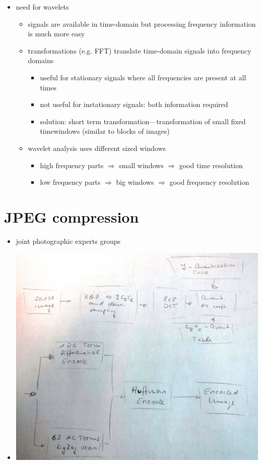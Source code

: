 \documentclass[a4paper,10pt]{scrreprt}
\begin{document}
\begin{itemize}
\begin{itemize}
 \end{itemize}
 \item need for wavelets
 \begin{itemize}
  \item signals are available in time-domain but processing frequency information is much more easy
  \item transformations (e.g. FFT) translate time-domain signals into frequency domains
  \begin{itemize}
   \item useful for stationary signals where all frequencies are present at all times
   \item not useful for instationary signals: both information required
   \item solution: short term transformation---transformation of small fixed timewindows (similar to blocks of images)
  \end{itemize}
  \item wavelet analysis uses different sized windows
  \begin{itemize}
   \item high frequency parts $\Rightarrow$ small windows $\Rightarrow$ good time resolution
   \item low frequency parts $\Rightarrow$ big windows $\Rightarrow$ good frequency resolution
  \end{itemize}
 \end{itemize}
\end{itemize}
\section{JPEG compression}
\begin{itemize}
 \item joint photographic experts groups
 \item \includegraphics[width=.8\linewidth]{jpeg.jpg}
\end{itemize}
\end{document}
